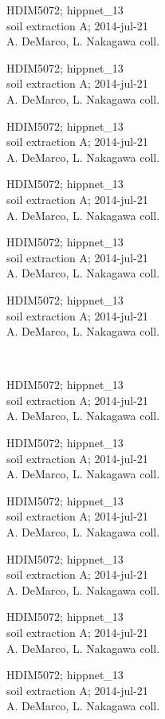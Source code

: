 \documentclass[2pt]{extarticle}
\begin{document}
\noindent
\parbox{0.16\textwidth}{\tiny \raggedright \rule[-0.3\baselineskip]{0pt}{10pt}HDIM5072; hippnet\_13\\ soil extraction A; 2014-jul-21\\ A. DeMarco, L. Nakagawa coll.}
\parbox{0.16\textwidth}{\tiny \raggedright \rule[-0.3\baselineskip]{0pt}{10pt}HDIM5072; hippnet\_13\\ soil extraction A; 2014-jul-21\\ A. DeMarco, L. Nakagawa coll.}
\parbox{0.16\textwidth}{\tiny \raggedright \rule[-0.3\baselineskip]{0pt}{10pt}HDIM5072; hippnet\_13\\ soil extraction A; 2014-jul-21\\ A. DeMarco, L. Nakagawa coll.}
\parbox{0.16\textwidth}{\tiny \raggedright \rule[-0.3\baselineskip]{0pt}{10pt}HDIM5072; hippnet\_13\\ soil extraction A; 2014-jul-21\\ A. DeMarco, L. Nakagawa coll.}
\parbox{0.16\textwidth}{\tiny \raggedright \rule[-0.3\baselineskip]{0pt}{10pt}HDIM5072; hippnet\_13\\ soil extraction A; 2014-jul-21\\ A. DeMarco, L. Nakagawa coll.}
\parbox{0.16\textwidth}{\tiny \raggedright \rule[-0.3\baselineskip]{0pt}{10pt}HDIM5072; hippnet\_13\\ soil extraction A; 2014-jul-21\\ A. DeMarco, L. Nakagawa coll.} \\ 
\vspace{0.001in} 

\noindent
\parbox{0.16\textwidth}{\tiny \raggedright \rule[-0.3\baselineskip]{0pt}{10pt}HDIM5072; hippnet\_13\\ soil extraction A; 2014-jul-21\\ A. DeMarco, L. Nakagawa coll.}
\parbox{0.16\textwidth}{\tiny \raggedright \rule[-0.3\baselineskip]{0pt}{10pt}HDIM5072; hippnet\_13\\ soil extraction A; 2014-jul-21\\ A. DeMarco, L. Nakagawa coll.}
\parbox{0.16\textwidth}{\tiny \raggedright \rule[-0.3\baselineskip]{0pt}{10pt}HDIM5072; hippnet\_13\\ soil extraction A; 2014-jul-21\\ A. DeMarco, L. Nakagawa coll.}
\parbox{0.16\textwidth}{\tiny \raggedright \rule[-0.3\baselineskip]{0pt}{10pt}HDIM5072; hippnet\_13\\ soil extraction A; 2014-jul-21\\ A. DeMarco, L. Nakagawa coll.}
\parbox{0.16\textwidth}{\tiny \raggedright \rule[-0.3\baselineskip]{0pt}{10pt}HDIM5072; hippnet\_13\\ soil extraction A; 2014-jul-21\\ A. DeMarco, L. Nakagawa coll.}
\parbox{0.16\textwidth}{\tiny \raggedright \rule[-0.3\baselineskip]{0pt}{10pt}HDIM5072; hippnet\_13\\ soil extraction A; 2014-jul-21\\ A. DeMarco, L. Nakagawa coll.} \\ 
\vspace{0.001in} 
\end{document}
